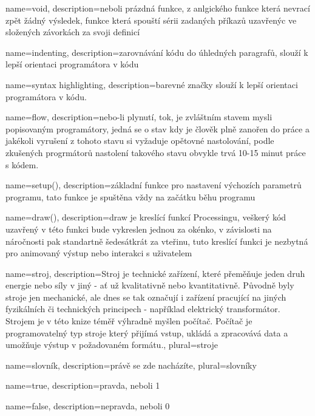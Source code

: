 {
  name={void},
  description={neboli prázdná funkce, z anlgického  funkce která nevrací zpět žádný výsledek, funkce která spouští sérii zadaných příkazů uzavřenýc ve složených závorkách za svoji definicí}
}

{
  name={indenting},
  description={zarovnávání kódu do úhledných paragrafů, slouží k lepší orientaci programátora v kódu}
}


{
  name={syntax highlighting},
  description={barevné značky slouží k lepší orientaci programátora v kódu.}
}

{
  name={flow},
  description={nebo-li plynutí, tok, je zvláštním stavem mysli popisovaným programátory, jedná se o stav kdy je člověk plně zanořen do práce a jakékoli vyrušení z tohoto stavu si vyžaduje opětovné nastolování, podle zkušených progrmátorů nastolení takového stavu obvykle trvá 10-15 minut práce s kódem.}
}

{
  name={setup()},
  description={základní funkce pro nastavení výchozích parametrů programu, tato funkce je spuštěna vždy na začátku běhu programu}
}

{
  name={draw()},
  description={draw je kreslící funkcí Processingu, veškerý kód uzavřený v této funkci bude vykreslen jednou za okénko, v závislosti na náročnosti pak standartně šedesátkrát za vteřinu, tuto kreslící funkci je nezbytná pro animovaný výstup nebo interakci s uživatelem}
}

{
  name={stroj},
  description={Stroj je technické zařízení, které přeměňuje jeden druh energie nebo síly v jiný - ať už kvalitativně nebo kvantitativně. Původně byly stroje jen mechanické, ale dnes se tak označují i zařízení pracující na jiných fyzikálních či technických principech - například elektrický transformátor. Strojem je v této knize téměř výhradně myšlen počítač. Počítač je programovatelný typ stroje který přijímá vstup, ukládá a zpracovává data a umožňuje výstup v požadovaném formátu.},
  plural={stroje}
}

{
  name={slovník},
  description={právě se zde nacházíte},
  plural={slovníky}
}


{
  name={true},
  description={pravda, neboli 1}
}

{
  name={false},
  description={nepravda, neboli 0}
}

